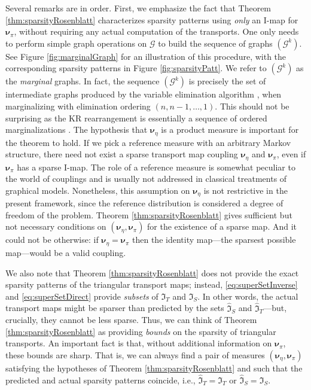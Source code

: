 \documentclass[twoside,11pt]{article}
\newcommand{\genm}{\boldsymbol{\nu} }   %
\newcommand{\Gcb}{\boldsymbol{\mathcal{G}}}
\newcommand{\sparse}{ \mathfrak{I} }
\begin{document}
%
%
Several remarks are in order. First, we emphasize the fact that
Theorem \ref{thm:sparsityRosenblatt} characterizes sparsity patterns
using \textit{only} an I-map for $\genm_\pi$, without requiring any actual
computation of the 
transports. 
%
One only needs to perform simple graph
operations on $\Gcb$ to build the sequence of graphs $(\Gcb^k)$. See
Figure \ref{fig:marginalGraph} for an illustration of this procedure,
with the corresponding sparsity patterns in
Figure \ref{fig:sparsityPatt}.
%
We refer to $(\Gcb^k)$ as the {\it marginal} graphs.  
%
%
%
%
%
In fact, the sequence $(\Gcb^k)$ is precisely the set of intermediate graphs 
produced by the variable elimination algorithm \citep[Ch.\ 9]{koller2009probabilistic}, 
%
when marginalizing 
%
%
%
with elimination ordering $(n, n-1, \ldots, 1)$. 
This should not be
surprising as the KR rearrangement is essentially a
sequence of ordered marginalizations \citep{villani2008optimal}.
%
The hypothesis that $\genm_\eta$ is a product measure 
is important for the theorem to hold. 
If we pick a reference measure with an arbitrary Markov structure, there need
not exist a sparse transport map coupling $\genm_\eta$ and $\genm_\pi$, even if
$\genm_\pi$ has a sparse I-map.
The role of a reference measure is somewhat peculiar to the world of
couplings and is usually not addressed in classical
treatments of graphical models. %
Nonetheless, this assumption on $\genm_\eta$
%
%
%
is not restrictive in the present framework,
since the reference distribution is considered a degree of freedom
of the problem.
Theorem \ref{thm:sparsityRosenblatt} gives sufficient but not
necessary conditions on $(\genm_\eta, \genm_\pi)$ for the existence of a sparse map.
And it could not be otherwise: if $\genm_\eta = \genm_\pi$ then the identity
map---the sparsest possible map---would be a valid coupling.


%
%
%
%
 
We also note that Theorem \ref{thm:sparsityRosenblatt} does not
provide the exact sparsity patterns of the triangular transport maps;
instead, \eqref{eq:superSetInverse} and \eqref{eq:superSetDirect}
provide \textit{subsets} of $\sparse_T$ and $\sparse_S$.
%
%
In other words, the actual
%
transport maps might be sparser than
predicted by the sets $\widehat{\sparse}_S$ and
$\widehat{\sparse}_T$---but, crucially, they cannot be less sparse.
%
%
Thus, we can think of Theorem \ref{thm:sparsityRosenblatt} as
providing \textit{bounds} on the sparsity of triangular transports.
%
An important fact is that, without additional information on $\genm_\pi$,
these
bounds are sharp.  That is, we can always find a pair of measures
$(\genm_\eta, \genm_\pi)$ satisfying the hypotheses of Theorem
\ref{thm:sparsityRosenblatt} and such that the predicted and actual
sparsity patterns coincide, i.e.,
$\widehat{\sparse}_T = \sparse_T $ or
$\widehat{\sparse}_S = \sparse_S$. 
%
%
%
%
%
%
%
%
%
%
%
%
%
%
%
%
%
%
%
%
%
%
%
%
%
%
%
%
%
%
%
%
%
%
%
%
%
%
%
%
%
%
%
%
%
%
%
%
%
%
%
%
%
%
%
%
%
%
%
%
%
%
%
%
%
%
%
%
%
%
%
%
%
%
%
%
%
%
%
%
%
%
\end{document}
